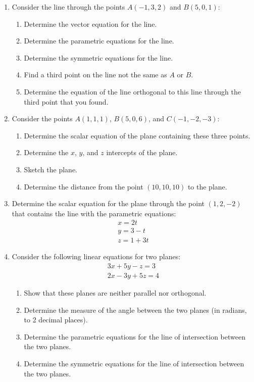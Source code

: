 \documentclass[letterpaper,12pt,fleqn]{article}
\begin{document}
\begin{enumerate}
\item Consider the line through the points \(A(-1,3,2)\) and \(B(5,0,1)\):
  \begin{enumerate}
  \item Determine the vector equation for the line.
  \item Determine the parametric equations for the line.
  \item Determine the symmetric equations for the line.
  \item Find a third point on the line not the same as \(A\) or \(B\).
  \item Determine the equation of the line orthogonal to this line through the third point that you found.
  \end{enumerate}

\item Consider the points \(A(1,1,1)\), \(B(5,0,6)\), and \(C(-1,-2,-3)\):
  \begin{enumerate}
  \item Determine the scalar equation of the plane containing these three points.
  \item Determine the \(x\), \(y\), and \(z\) intercepts of the plane.
  \item Sketch the plane.
  \item Determine the distance from the point \((10,10,10)\) to the plane.
  \end{enumerate}

\item Determine the scalar equation for the plane through the point \((1,2,-2)\) that contains the line with the
  parametric equations:
  \begin{gather*}
    x=2t \\
    y=3-t \\
    z=1+3t
  \end{gather*}

\item Consider the following linear equations for two planes:
  \begin{gather*}
    3x+5y-z=3 \\
    2x-3y+5z=4
  \end{gather*}
  \begin{enumerate}
  \item Show that these planes are neither parallel nor orthogonal.
  \item Determine the measure of the angle between the two planes (in radians, to 2 decimal places).
  \item Determine the parametric equations for the line of intersection between the two planes.
  \item Determine the symmetric equations for the line of intersection between the two planes.
  \end{enumerate}


\end{enumerate}
\end{document}
